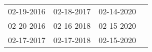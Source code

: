 \begin{supertabular}{llll}
 02-19-2016 &  02-18-2017 &  02-14-2020 \\
 02-20-2016 &  02-16-2018 &  02-15-2020 \\
 02-17-2017 &  02-17-2018 &  02-15-2020 \\
\end{supertabular}
